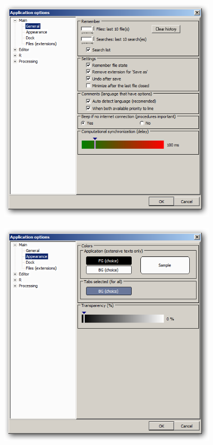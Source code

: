 \begin{figure}[h!]
  \includegraphics[scale=0.35]{./res/app_main_general.png}~~
  \includegraphics[scale=0.35]{./res/app_main_appearance.png}\\

\end{figure}
